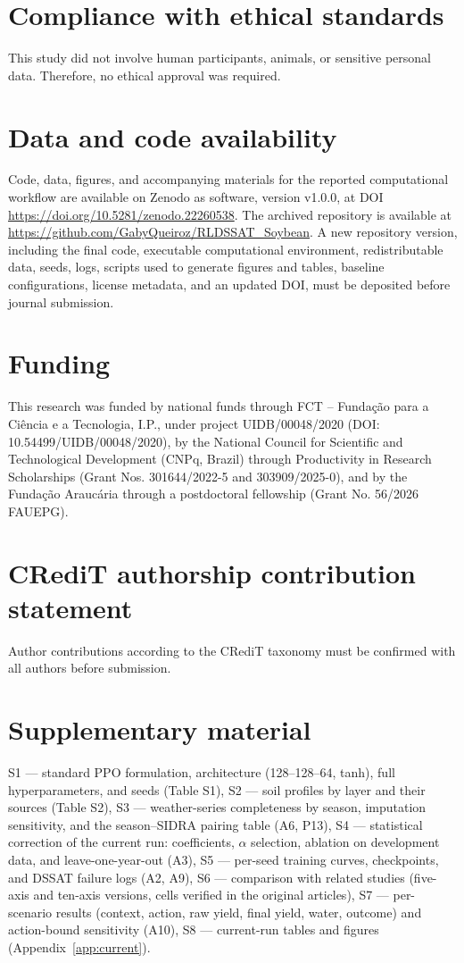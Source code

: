 \documentclass[times,final,authoryear]{elsarticle}
\begin{document}
\section*{Compliance with ethical standards}
This study did not involve human participants, animals, or sensitive personal data. Therefore, no ethical approval was required.

\section*{Data and code availability}

Code, data, figures, and accompanying materials for the reported computational workflow are available on Zenodo as software, version v1.0.0, at DOI \url{https://doi.org/10.5281/zenodo.22260538}. The archived repository is available at \url{https://github.com/GabyQueiroz/RLDSSAT_Soybean}. A new repository version, including the final code, executable computational environment, redistributable data, seeds, logs, scripts used to generate figures and tables, baseline configurations, license metadata, and an updated DOI, must be deposited before journal submission.

\section*{Funding}
This research was funded by national funds through FCT – Fundação para a Ciência e a Tecnologia, I.P., under project UIDB/00048/2020 (DOI: 10.54499/UIDB/00048/2020), by the National Council for Scientific and Technological Development (CNPq, Brazil) through Productivity in Research Scholarships (Grant Nos. 301644/2022-5 and 303909/2025-0), and by the Fundação Araucária through a postdoctoral fellowship (Grant No. 56/2026 FAUEPG).

\section*{CRediT authorship contribution statement}

Author contributions according to the CRediT taxonomy must be confirmed with all authors before submission.

\section*{Supplementary material}

 S1 --- standard PPO formulation, architecture (128--128--64, tanh), full hyperparameters, and seeds (Table S1), S2 --- soil profiles by layer and their sources (Table S2), S3 --- weather-series completeness by season, imputation sensitivity, and the season--SIDRA pairing table (A6, P13), S4 --- statistical correction of the current run: coefficients, $\alpha$ selection, ablation on development data, and leave-one-year-out (A3), S5 --- per-seed training curves, checkpoints, and DSSAT failure logs (A2, A9), S6 --- comparison with related studies (five-axis and ten-axis versions, cells verified in the original articles), S7 --- per-scenario results (context, action, raw yield, final yield, water, outcome) and action-bound sensitivity (A10), S8 --- current-run tables and figures (Appendix~\ref{app:current}).





\end{document}
